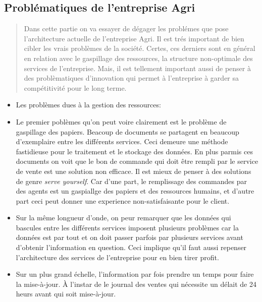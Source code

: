\documentclass[a4paper]{report}
\begin{document}
\begin{doublespace}
\section{Problématiques de l'entreprise Agri}

\begin{quote}
Dans cette partie on va essayer de dégager les problémes que pose
l'architecture actuelle de l'entreprise Agri. Il est trés important de
bien cibler les vrais problèmes de la société. Certes, ces derniers sont
en général en relation avec le gaspillage des ressources, la structure
non-optimale des services de l'entreprise. Mais, il est tellement
important aussi de penser à des problèmatiques d'innovation qui permet à
l'entreprise à garder sa compétitivité pour le long terme.
\end{quote}

\begin{itemize}
\item
  Les problèmes dues à la gestion des ressources:
\end{itemize}

\begin{itemize}
\item
  Le premier poblèmes qu'on peut voire clairement est le problème de
  gaspillage des papiers. Beacoup de documents se partagent en beaucoup
  d'exemplaire entre les différents services. Ceci demeure une méthode
  fastidieuse pour le traitement et le stockage des données. En plus
  parmis ces documents on voit que le bon de commande qui doit être
  rempli par le service de vente est une solution non efficace. Il est
  mieux de penser à des solutions de genre \emph{serve yourself}. Car
  d'une part, le remplissage des commandes par des agents est un
  gaspiallge des papiers et des ressources humains, et d'autre part ceci
  peut donner une experience non-satisfaisante pour le client.
\item
  Sur la même longueur d'onde, on peur remarquer que les données qui
  bascules entre les différents services imposent plusieurs problèmes
  car la données est par tout et on doit passer parfois par plusieurs
  services avant d'obtenir l'information en question. Ceci implique
  qu'il faut aussi repenser l'architecture des services de l'entreprise
  pour en bien tirer profit.
\item
  Sur un plus grand échelle, l'information par fois prendre un temps
  pour faire la mise-à-jour. À l'instar de le journal des ventes qui
  nécessite un délait de 24 heurs avant qui soit mise-à-jour.
\end{itemize}


\end{doublespace}
\end{document}
